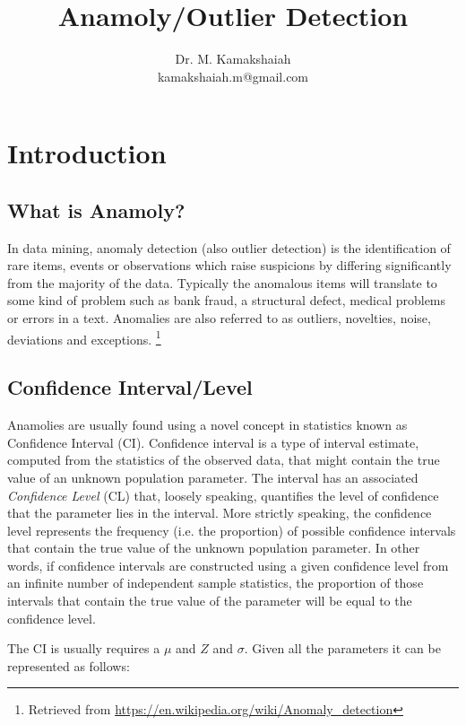 \documentclass{article}
\title{Anamoly/Outlier Detection}
\author{Dr. M. Kamakshaiah \\ \small{kamakshaiah.m@gmail.com}}
\date{}
\begin{document}

\maketitle
\newpage
\tableofcontents
\newpage

\section{Introduction}

\subsection{What is Anamoly?}

In data mining, anomaly detection (also outlier detection) is the identification of rare items, events or observations which raise suspicions by differing significantly from the majority of the data. Typically the anomalous items will translate to some kind of problem such as bank fraud, a structural defect, medical problems or errors in a text. Anomalies are also referred to as outliers, novelties, noise, deviations and exceptions. \footnote{Retrieved from \url{https://en.wikipedia.org/wiki/Anomaly_detection}} 

\subsection{Confidence Interval/Level}

Anamolies are usually found using a novel concept in statistics known as Confidence Interval (CI). Confidence interval is a type of interval estimate, computed from the statistics of the observed data, that might contain the true value of an unknown population parameter. The interval has an associated \emph{Confidence Level} (CL) that, loosely speaking, quantifies the level of confidence that the parameter lies in the interval. More strictly speaking, the confidence level represents the frequency (i.e. the proportion) of possible confidence intervals that contain the true value of the unknown population parameter. In other words, if confidence intervals are constructed using a given confidence level from an infinite number of independent sample statistics, the proportion of those intervals that contain the true value of the parameter will be equal to the confidence level.

The CI is usually requires a $\mu$ and $Z$ and $\sigma$. Given all the parameters it can be represented as follows:
\end{document}
